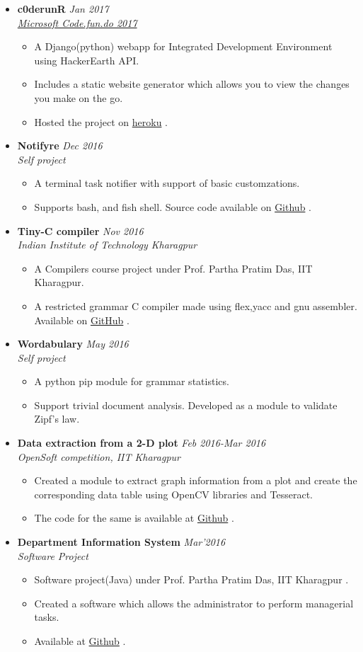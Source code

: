 \documentclass[10pt,a4paper]{moderncv}
\newcommand{\experience}[4]{
  \vspace{0.1cm}
  \item \textbf{\large{#1}} \hfill\textit{#3}\\\textit{#2}
  \begin{itemize}[leftmargin=*]
    \setlength\itemsep{0em} #4
  \end{itemize}
}
\newcommand{\project}[3]{
  \vspace{0.1cm}
  \item \textbf{\large{#1}} \hfill\textit{#2}\\\textit{Self project}
  \begin{itemize}[leftmargin=*]
    \setlength\itemsep{0em} #3
  \end{itemize}
}
\newcommand{\newlink}[2]{
  \href{#1}{\color{blue}#2}
}
\begin{document}
\begin{itemize}
  \experience{c0derunR}{\href{https://drive.google.com/open?id=0B5iU6cWw36rOOG9yZ2hxSTFTUEk}{Microsoft Code.fun.do 2017}}{Jan 2017}{
  	\item A Django(python) webapp for Integrated Development Environment using HackerEarth API.
  	\item Includes a static website generator which allows you to view the changes you make on the go.
  	\item Hosted the project on \newlink{http://c0derunr.herokuapp.com/}{heroku}.
  }

  \project{Notifyre}{Dec 2016}{
	\item A terminal task notifier with support of basic customzations. 
	\item Supports bash, and fish shell. Source code available on \newlink{https://github.com/kaustubhhiware/NotiFyre}{Github}.
  }
  
  \experience{Tiny-C compiler}{Indian Institute of Technology Kharagpur}{Nov 2016}{
  \item A Compilers course project under Prof. Partha Pratim Das, IIT Kharagpur.
  \item A restricted grammar C compiler made using flex,yacc and gnu assembler. Available on \newlink{https://github.com/kaustubhhiware/cOMPILER}{GitHub}.
  }

  \project{Wordabulary}{May 2016}{
    \item A python pip module for grammar statistics.
    \item Support trivial document analysis. Developed as a module to validate Zipf's law.
  }

  \experience{Data extraction from a 2-D plot}{OpenSoft competition, IIT Kharagpur}{Feb 2016-Mar 2016}{
  	\item Created a module to extract graph information from a plot and create the corresponding data table using OpenCV libraries and Tesseract.
  	\item The code for the same is available at \newlink{https://github.com/Azad-Hall/open-soft-2015-2016}{Github}.
  }

  \experience{Department Information System}{Software Project}{Mar'2016}{
  \item Software project(Java) under Prof. Partha Pratim Das, IIT Kharagpur .
  \item Created a software which allows the administrator to perform managerial tasks.
  \item Available at \newlink{https://github.com/kaustubhhiware/DepInfosys}{Github}.
  }
\end{itemize}
\end{document}
